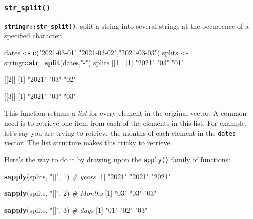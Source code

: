 \documentclass[]{book}
\newenvironment{Shaded}{\begin{snugshade}}{\end{snugshade}}
\newcommand{\CommentTok}[1]{\textcolor[rgb]{0.56,0.35,0.01}{\textit{#1}}}
\newcommand{\DecValTok}[1]{\textcolor[rgb]{0.00,0.00,0.81}{#1}}
\newcommand{\KeywordTok}[1]{\textcolor[rgb]{0.13,0.29,0.53}{\textbf{#1}}}
\newcommand{\NormalTok}[1]{#1}
\newcommand{\OperatorTok}[1]{\textcolor[rgb]{0.81,0.36,0.00}{\textbf{#1}}}
\newcommand{\StringTok}[1]{\textcolor[rgb]{0.31,0.60,0.02}{#1}}
\begin{document}
\hypertarget{str_split}{%
\subsubsection*{\texorpdfstring{\texttt{str\_split()}}{str\_split()}}\label{str_split}}

\textbf{\texttt{stringr::str\_split()}}: split a string into several strings at the occurrence of a specified character.

\begin{Shaded}
\begin{Highlighting}[]
\NormalTok{dates <-}\StringTok{ }\KeywordTok{c}\NormalTok{(}\StringTok{"2021-03-01"}\NormalTok{,}\StringTok{"2021-03-02"}\NormalTok{,}\StringTok{"2021-03-03"}\NormalTok{)}
\NormalTok{splits <-}\StringTok{ }\NormalTok{stringr}\OperatorTok{::}\KeywordTok{str_split}\NormalTok{(dates,}\StringTok{"-"}\NormalTok{)}
\NormalTok{splits}
\NormalTok{[[}\DecValTok{1}\NormalTok{]]}
\NormalTok{[}\DecValTok{1}\NormalTok{] }\StringTok{"2021"} \StringTok{"03"}   \StringTok{"01"}  

\NormalTok{[[}\DecValTok{2}\NormalTok{]]}
\NormalTok{[}\DecValTok{1}\NormalTok{] }\StringTok{"2021"} \StringTok{"03"}   \StringTok{"02"}  

\NormalTok{[[}\DecValTok{3}\NormalTok{]]}
\NormalTok{[}\DecValTok{1}\NormalTok{] }\StringTok{"2021"} \StringTok{"03"}   \StringTok{"03"}  
\end{Highlighting}
\end{Shaded}

This function returns a \emph{list} for every element in the original vector. A common need is to retrieve one item from each of the elements in this list. For example, let's say you are trying to retrieve the months of each element in the \texttt{dates} vector. The list structure makes this tricky to retrieve.

Here's the way to do it by drawing upon the \texttt{apply()} family of functions:

\begin{Shaded}
\begin{Highlighting}[]
\KeywordTok{sapply}\NormalTok{(splits, }\StringTok{"[["}\NormalTok{, }\DecValTok{1}\NormalTok{) }\CommentTok{# years}
\NormalTok{[}\DecValTok{1}\NormalTok{] }\StringTok{"2021"} \StringTok{"2021"} \StringTok{"2021"}

\KeywordTok{sapply}\NormalTok{(splits, }\StringTok{"[["}\NormalTok{, }\DecValTok{2}\NormalTok{) }\CommentTok{# Months}
\NormalTok{[}\DecValTok{1}\NormalTok{] }\StringTok{"03"} \StringTok{"03"} \StringTok{"03"}

\KeywordTok{sapply}\NormalTok{(splits, }\StringTok{"[["}\NormalTok{, }\DecValTok{3}\NormalTok{) }\CommentTok{# days}
\NormalTok{[}\DecValTok{1}\NormalTok{] }\StringTok{"01"} \StringTok{"02"} \StringTok{"03"}
\end{Highlighting}
\end{Shaded}
\end{document}

